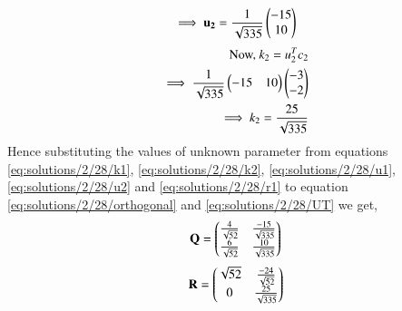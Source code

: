 \begin{align}
\implies\mathbf{u_2} = \frac{1}{\sqrt{335}}\begin{pmatrix}-15\\10\end{pmatrix}\label{eq:solutions/2/28/u2}
\end{align}
\begin{align}
\mbox{Now, } k_2 = u_2^Tc_2\\
\implies \frac{1}{\sqrt{335}}\begin{pmatrix}-15&10\end{pmatrix}\begin{pmatrix}-3\\-2\end{pmatrix}\\\implies k_2 = \frac{25}{\sqrt{335}} \label{eq:solutions/2/28/k2}
\end{align}
Hence substituting the values of unknown parameter from equations \eqref{eq:solutions/2/28/k1}, \eqref{eq:solutions/2/28/k2}, \eqref{eq:solutions/2/28/u1}, \eqref{eq:solutions/2/28/u2} and \eqref{eq:solutions/2/28/r1} to equation \eqref{eq:solutions/2/28/orthogonal} and \eqref{eq:solutions/2/28/UT} we get,
\begin{align}
\mathbf{Q} = \begin{pmatrix}\frac{4}{\sqrt{52}}&\frac{-15}{\sqrt{335}}\\\frac{6}{\sqrt{52}}&\frac{10}{\sqrt{335}}\end{pmatrix}
\end{align} 
\begin{align}
\mathbf{R} = \begin{pmatrix}\sqrt{52}&\frac{-24}{\sqrt{52}}\\0&\frac{25}{\sqrt{335}}\end{pmatrix}
\end{align}

